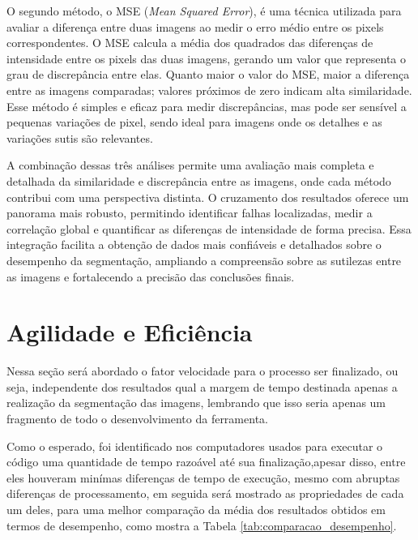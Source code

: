O segundo método, o MSE (\textit{Mean Squared Error}), é uma técnica utilizada para avaliar a diferença entre duas imagens ao medir o erro médio entre os pixels correspondentes. O MSE calcula a média dos quadrados das diferenças de intensidade entre os pixels das duas imagens, gerando um valor que representa o grau de discrepância entre elas. Quanto maior o valor do MSE, maior a diferença entre as imagens comparadas; valores próximos de zero indicam alta similaridade. Esse método é simples e eficaz para medir discrepâncias, mas pode ser sensível a pequenas variações de pixel, sendo ideal para imagens onde os detalhes e as variações sutis são relevantes.

A combinação dessas três análises permite uma avaliação mais completa e detalhada da similaridade e discrepância entre as imagens, onde cada método contribui com uma perspectiva distinta. O cruzamento dos resultados oferece um panorama mais robusto, permitindo identificar falhas localizadas, medir a correlação global e quantificar as diferenças de intensidade de forma precisa. Essa integração facilita a obtenção de dados mais confiáveis e detalhados sobre o desempenho da segmentação, ampliando a compreensão sobre as sutilezas entre as imagens e fortalecendo a precisão das conclusões finais.

\section{Agilidade e Eficiência}
Nessa seção será abordado o fator velocidade para o processo ser finalizado, ou seja, independente dos resultados qual a margem de tempo destinada apenas a realização da segmentação das imagens, lembrando que isso seria apenas um fragmento de todo o desenvolvimento da ferramenta.

Como o esperado, foi identificado nos computadores usados para executar o código uma quantidade de tempo razoável até sua finalização,apesar disso, entre eles houveram minímas diferenças de tempo de execução, mesmo com abruptas diferenças de processamento, em seguida será mostrado as propriedades de cada um deles, para uma melhor comparação da média dos resultados obtidos em termos de desempenho, como mostra a Tabela \ref{tab:comparacao_desempenho}.

